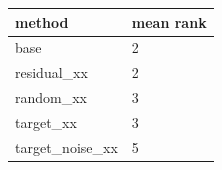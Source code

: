 \begin{tabular}{ll}
\toprule
method & mean rank \\
\midrule
base & 2 \\
residual\_xx & 2 \\
random\_xx & 3 \\
target\_xx & 3 \\
target\_noise\_xx & 5 \\
\bottomrule
\end{tabular}
